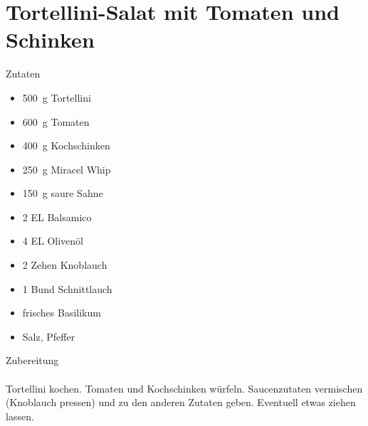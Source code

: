 \section*{Tortellini-Salat mit Tomaten und Schinken}
\ihead{}\ohead{}
\cfoot{}
{\Large Zutaten}
\begin{multicols}{2}
\begin{itemize}
    \item \SI{500}{g} Tortellini
    \item \SI{600}{g} Tomaten
    \item \SI{400}{g} Kochschinken
    \item \SI{250}{g} Miracel Whip
    \item \SI{150}{g} saure Sahne
    \item \num{2} EL Balsamico
    \item \num{4} EL Olivenöl
    \item \num{2} Zehen Knoblauch
    \item \num{1} Bund Schnittlauch
    \item frisches Basilikum
    \item Salz, Pfeffer
\end{itemize}
\end{multicols}
\noindent
{\Large Zubereitung}\\
\\
Tortellini kochen.
Tomaten und Kochschinken würfeln.
Saucenzutaten vermischen (Knoblauch pressen) und zu den anderen Zutaten geben.
Eventuell etwas ziehen lassen.
